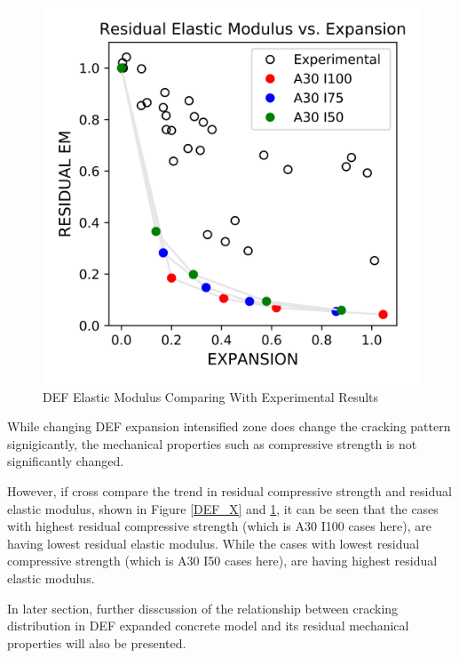 \begin{figure}[ht!]
\centering
\includegraphics[width=.8\linewidth]{Files/CS_plot/DEFEM3.png}
  \caption{DEF Elastic Modulus Comparing With Experimental Results}
  \label{DEF_X_EM}
\end{figure}

While changing DEF expansion intensified zone does change the cracking pattern signigicantly, the mechanical properties such as compressive strength is not significantly changed.

However, if cross compare the trend in residual compressive strength and residual elastic modulus, shown in Figure \ref{DEF_X} and \ref{DEF_X_EM}, it can be seen that the cases with highest residual compressive strength (which is A30 I100 cases here), are having lowest residual elastic modulus. While the cases with lowest residual compressive strength (which is A30 I50 cases here), are having highest residual elastic modulus.

In later section, further disscussion of the relationship between cracking distribution in DEF expanded concrete model and its residual mechanical properties will also be presented.
